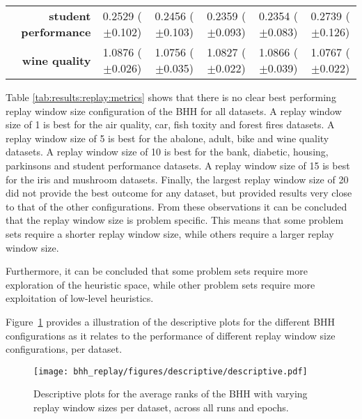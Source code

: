 \begin{table}[htbp]
{\begin{tabular}{r|ccccc}
			\textbf{student performance} & \cellcolor[rgb]{ .996,  .792,  .494}0.2529 ($\pm$0.102) & \cellcolor[rgb]{ 1,  .922,  .518}0.2456 ($\pm$0.103)    & \cellcolor[rgb]{ .42,  .753,  .482}0.2359 ($\pm$0.093)  & \cellcolor[rgb]{ .388,  .745,  .482}0.2354 ($\pm$0.083) & \cellcolor[rgb]{ .973,  .412,  .42}0.2739 ($\pm$0.126)  \\
			\textbf{wine quality}        & \cellcolor[rgb]{ .973,  .412,  .42}1.0876 ($\pm$0.026)  & \cellcolor[rgb]{ .388,  .745,  .482}1.0756 ($\pm$0.035) & \cellcolor[rgb]{ 1,  .922,  .518}1.0827 ($\pm$0.022)    & \cellcolor[rgb]{ .98,  .522,  .443}1.0866 ($\pm$0.039)  & \cellcolor[rgb]{ .482,  .773,  .486}1.0767 ($\pm$0.022) \\
		\end{tabular}%
	}
\end{table}%

Table \ref{tab:results:replay:metrics} shows that there is no clear best performing replay window size configuration of the \acs{BHH} for all datasets. A replay window size of 1 is best for the air quality, car, fish toxity and forest fires datasets. A replay window size of 5 is best for the abalone, adult, bike and wine quality datasets. A replay window size of 10 is best for the bank, diabetic, housing, parkinsons and student performance datasets. A replay window size of 15 is best for the iris and mushroom datasets. Finally, the largest replay window size of 20 did not provide the best outcome for any dataset, but provided results very close to that of the other configurations. From these observations it can be concluded that the replay window size is problem specific. This means that some problem sets require a shorter replay window size, while others require a larger replay window size.

Furthermore, it can be concluded that some problem sets require more exploration of the heuristic space, while other problem sets require more exploitation of low-level heuristics.

Figure~\ref{fig:results:replay:descriptive:descriptive} provides a illustration of the descriptive plots for the different \acs{BHH} configurations as it relates to the performance of different replay window size configurations, per dataset.

\begin{figure}[htbp]
	\centering
	\texttt{[image: bhh\_replay/figures/descriptive/descriptive.pdf]}
	\caption{Descriptive plots for the average ranks of the \acs{BHH} with varying replay window sizes per dataset, across all runs and epochs.}
	\label{fig:results:replay:descriptive:descriptive}
\end{figure}

